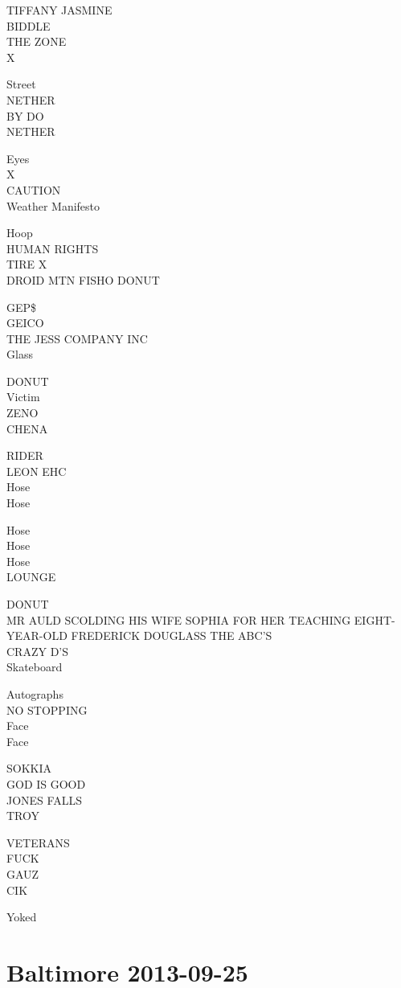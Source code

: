 \documentclass[10pt,letterpaper]{article}
\begin{document}
TIFFANY JASMINE\\
BIDDLE\\
THE ZONE\\
X

Street\\
NETHER\\
BY DO\\
NETHER

Eyes\\
X\\
CAUTION\\
Weather Manifesto

Hoop\\
HUMAN RIGHTS\\
TIRE X\\
DROID MTN FISHO DONUT

GEP\$\\
GEICO\\
THE JESS COMPANY INC\\
Glass

DONUT\\
Victim\\
ZENO\\
CHENA

RIDER\\
LEON EHC\\
Hose\\
Hose

Hose\\
Hose\\
Hose\\
LOUNGE

DONUT\\
MR AULD SCOLDING HIS WIFE SOPHIA FOR HER TEACHING EIGHT{-}YEAR{-}OLD FREDERICK DOUGLASS THE ABC'S\\
CRAZY D'S\\
Skateboard

Autographs\\
NO STOPPING\\
Face\\
Face

SOKKIA\\
GOD IS GOOD\\
JONES FALLS\\
TROY

VETERANS\\
FUCK\\
GAUZ\\
CIK

Yoked


\section*{Baltimore 2013-09-25}
\end{document}
